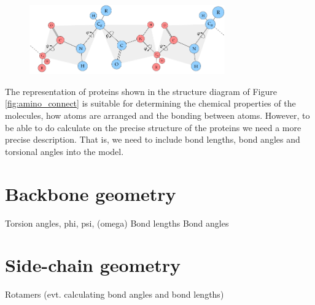 \begin{figure}
  \centering
  \includegraphics[width=0.75\textwidth]{figures/protein-torsion-angles}
  \label{fig:protein-torsion-angles}
  \caption{}
\end{figure}

The representation of proteins shown in the structure diagram of
Figure \ref{fig:amino_connect} is suitable for determining the
chemical properties of the molecules, how atoms are arranged and the
bonding between atoms. However, to be able to do calculate on the
precise structure of the proteins we need a more precise
description. That is, we need to include bond lengths, bond angles and
torsional angles into the model.

\section{Backbone geometry}
Torsion angles, phi, psi, (omega)
Bond lengths
Bond angles


\section{Side-chain geometry}
Rotamers (evt. calculating bond angles and bond lengths)
